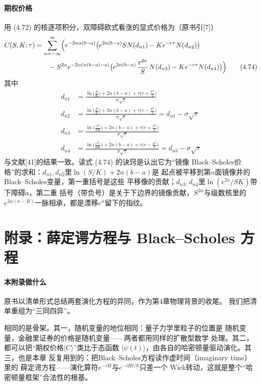 \paragraph{期权价格}
用 (4.72) 的核逐项积分，双障碍欧式看涨的显式价格为（原书引[7]）
\begin{align*}
C(S,K;\tau)&=\sum_{n=-\infty}^{\infty}
\Bigl(e^{-2n\alpha(b-a)}\bigl(e^{2n(b-a)}SN(d_{n1})
-Ke^{-r\tau}N(d_{n2})\bigr)\\
&\qquad-S^{2\alpha}e^{-2\alpha(n(b-a)-a)}
\bigl(e^{2n(b-a)}\,\frac{e^{2a}}{S}\,N(d_{n3})-Ke^{-r\tau}N(d_{n4})\bigr)\Bigr)
\tag{4.74}
\end{align*}
其中
\begin{align*}
d_{n1}&=\frac{\ln\bigl(\frac{S}{K}\bigr)+2n(b-a)
+\tau\bigl(r+\frac{\sigma^{2}}{2}\bigr)}{\sigma\sqrt{\tau}}\\
d_{n2}&=\frac{\ln\bigl(\frac{S}{K}\bigr)+2n(b-a)
+\tau\bigl(r-\frac{\sigma^{2}}{2}\bigr)}{\sigma\sqrt{\tau}}
=d_{n1}-\sigma\sqrt{\tau}\\
d_{n3}&=\frac{\ln\bigl(\frac{e^{2a}}{SK}\bigr)+2n(b-a)
+\tau\bigl(r+\frac{\sigma^{2}}{2}\bigr)}{\sigma\sqrt{\tau}}\\
d_{n4}&=\frac{\ln\bigl(\frac{e^{2a}}{SK}\bigr)+2n(b-a)
+\tau\bigl(r-\frac{\sigma^{2}}{2}\bigr)}{\sigma\sqrt{\tau}}
=d_{n3}-\sigma\sqrt{\tau}
\tag{4.75}
\end{align*}
与文献[41]的结果一致。读式 (4.74) 的诀窍是认出它为“镜像
Black--Scholes价格”的求和：$d_{n1},d_{n2}$里$\ln(S/K)+2n(b-a)$是
起点被平移到第$n$面镜像井的Black--Scholes变量，第一重括号是这些
平移像的贡献；$d_{n3},d_{n4}$里$\ln(e^{2a}/SK)$带下障碍$a$，第二重
括号（带负号）是关于下边界的镜像贡献，$S^{2\alpha}$与级数核里的
$e^{2\alpha(x-B)}$一脉相承，都是漂移$e^x$留下的指纹。

\section{附录：薛定谔方程与 Black--Scholes 方程}

\paragraph{本附录做什么}
原书以清单形式总结两套演化方程的异同，作为第4章物理背景的收尾。
我们把清单重组为“三同四异”。

相同的是骨架。其一，随机变量的地位相同：量子力学里粒子的位置是
随机变量，金融里证券的价格是随机变量——两者都用同样的扩散型数学
处理。其二，都可以把“期权价格$\vert C\rangle$”类比于态函数
$\vert\psi(t)\rangle$，由各自的哈密顿量驱动演化。其三，也是本章
反复用到的：把Black--Scholes方程读作虚时间（imaginary time）里的
薛定谔方程——演化算符$e^{-\tau H}$与$e^{-iHt/\hbar}$只差一个
Wick转动，这就是整个“哈密顿量框架”合法性的根基。

